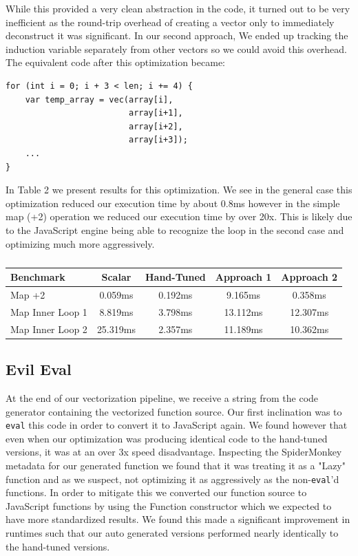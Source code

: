 \documentclass[conference]{IEEEtran}
\begin{document}
While this provided a very clean abstraction in the code, it turned out to be
very inefficient as the round-trip overhead of creating a vector only to
immediately deconstruct it was significant. In our second approach, We ended up
tracking the induction variable separately from other vectors so we could avoid
this overhead. The equivalent code after this optimization became:
\begin{verbatim}
for (int i = 0; i + 3 < len; i += 4) {
    var temp_array = vec(array[i],
                         array[i+1],
                         array[i+2],
                         array[i+3]);
    ...
}
\end{verbatim}

In Table 2 we present results for this optimization. We see in the general case
this optimization reduced our execution time by about 0.8ms however in the
simple map (+2) operation we reduced our execution time by over 20x. This is
likely due to the JavaScript engine being able to recognize the loop in the
second case and optimizing much more aggressively.

\begin{table}[!t]
\centering
\caption{}
\begin{tabular}{|l||c|c|c|c|}
\hline
Benchmark & Scalar & Hand-Tuned & Approach 1 & Approach 2 \\ \hline
Map +2 & 0.059ms & 0.192ms & 9.165ms & 0.358ms \\ \hline
Map Inner Loop 1 & 8.819ms & 3.798ms & 13.112ms & 12.307ms \\ \hline
Map Inner Loop 2 & 25.319ms & 2.357ms & 11.189ms & 10.362ms \\ \hline
\end{tabular}
\end{table}


\subsection{Evil Eval}
At the end of our vectorization pipeline, we receive a string from the code
generator containing the vectorized function source. Our first inclination was
to \texttt{eval} this code in order to convert it to JavaScript again. We found
however that even when our optimization was producing identical code to the
hand-tuned versions, it was at an over 3x speed disadvantage. Inspecting the
SpiderMonkey metadata for our generated function we found that it was treating
it as a "Lazy" function and as we suspect, not optimizing it as aggressively as
the non-\texttt{eval}'d functions. In order to mitigate this we converted our
function source to JavaScript functions by using the Function constructor which
we expected to have more standardized results. We found this made a significant
improvement in runtimes such that our auto generated versions performed nearly
identically to the hand-tuned versions.
\end{document}
